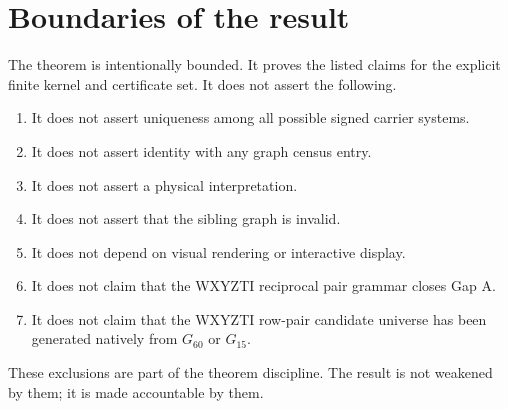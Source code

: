 \section{Boundaries of the result}

The theorem is intentionally bounded. It proves the listed claims for the explicit finite kernel and certificate set. It does not assert the following.

\begin{enumerate}[leftmargin=2em]
\item It does not assert uniqueness among all possible signed carrier systems.
\item It does not assert identity with any graph census entry.
\item It does not assert a physical interpretation.
\item It does not assert that the sibling graph is invalid.
\item It does not depend on visual rendering or interactive display.
\item It does not claim that the WXYZTI reciprocal pair grammar closes Gap A.
\item It does not claim that the WXYZTI row-pair candidate universe has been generated natively from \(G_{60}\) or \(G_{15}\).
\end{enumerate}

These exclusions are part of the theorem discipline. The result is not weakened by them; it is made accountable by them.

